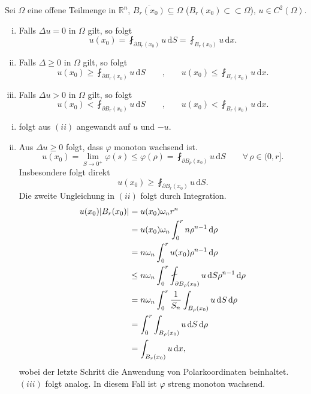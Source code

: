 \begin{korollar}[Mittelwerteigenschaft]
	Sei $\Omega$ eine offene Teilmenge in $\mathbb{R}^n$, $\overline{B_r(x_0)} \subseteq \Omega$ ($B_r(x_0) \subset \subset \Omega$), $u \in C^2(\Omega)$.
	\begin{enumerate}[(i)]
		\item Falls $ \Delta u = 0 $ in $\Omega$ gilt, so folgt
		\begin{equation}
			u(x_0) = \fint_{\partial B_r(x_0)}^{} u \,\mathrm{d}S = \fint_{B_r(x_0)}^{} u 	\,\mathrm{d}x.
		\end{equation}
		\item Falls $\Delta \geq 0$ in $\Omega$ gilt, so folgt
		\begin{equation}
			u(x_0) \geq \fint_{\partial B_r(x_0)}^{} u \,\mathrm{d}S \qquad \text{,} \qquad u(x_0) \leq \fint_{B_r(x_0)}^{}u \,\mathrm{d}x.
		\end{equation}
		\item Falls $\Delta u > 0$ in $\Omega$ gilt, so folgt
		\begin{equation}
			u(x_0) < \fint_{\partial B_r(x_0)}^{} u\,\mathrm{d}S \qquad \text{,} \qquad u(x_0) < \fint_{B_r(x_0)}^{} u \,\mathrm{d}x.
		\end{equation}
	\end{enumerate}
	\end{korollar}
	\begin{beweis}
		\begin{enumerate}[(i)]
			\item folgt aus $(ii)$ angewandt auf $u$ und $-u$.
			\item Aus $\Delta u \geq 0$ folgt, dass $\varphi$ monoton wachsend ist.
			\begin{equation}
				u(x_0) = \lim_{S \to 0^+} \varphi(s) \leq \varphi(\rho) = \fint_{\partial B_{\rho}(x_0)}^{}u \,\mathrm{d}S \qquad \forall\, \rho \in (0,r].
			\end{equation}
			Insbesondere folgt direkt
			\[
				u(x_0) \geq \fint_{\partial B_r(x_0)}^{}u \,\mathrm{d}S.
			\]
			Die zweite Ungleichung in $(ii)$ folgt durch Integration.
			\begin{align*}
				u(x_0)\abs{B_r(x_0)} &= u(x_0) \omega_n r^n \\ &= u(x_0) \omega_n \int_{0}^{r}n \rho^{n-1} \,\mathrm{d}\rho \\ 
				&= n\omega_n \int_{0}^{r}u(x_0)\rho^{n-1} \,\mathrm{d}\rho  \\
				&\leq n \omega_n \int_{0}^{r}\fint_{\partial B_{\rho}(x_0)}^{} u \,\mathrm{d}S \rho^{n-1} \,\mathrm{d}\rho \\
				&= n \omega_n \int_{0}^{r} \frac{1}{S_n} \int_{B_{\rho}(x_0)}^{} u \,\mathrm{d}S \,\mathrm{d}\rho \\
				&= \int_{0}^{r} \int_{B_{\rho}(x_0)}^{}u \,\mathrm{d}S \,\mathrm{d}\rho \\
				&= \int_{B_{r}(x_0)}^{}u \,\mathrm{d}x,
			\end{align*}
			wobei der letzte Schritt die Anwendung von Polarkoordinaten beinhaltet. $(iii)$ folgt analog. In diesem Fall ist $\varphi$ streng monoton wachsend.
			\end{enumerate}
	\end{beweis}

